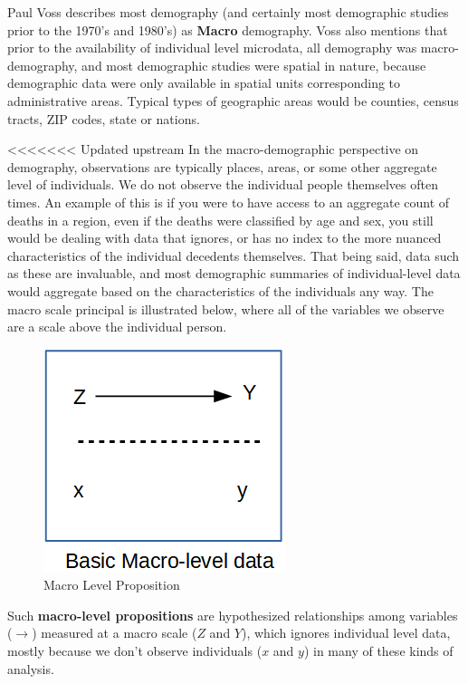 \documentclass[
]{article}
\begin{document}
Paul Voss \citeyearpar{voss_demography_2007} describes most demography (and certainly most demographic studies prior to the 1970's and 1980's) as \textbf{Macro} demography. Voss also mentions that prior to the availability of individual level microdata, all demography was macro-demography, and most demographic studies were spatial in nature, because demographic data were only available in spatial units corresponding to administrative areas. Typical types of geographic areas would be counties, census tracts, ZIP codes, state or nations.

\textless\textless\textless\textless\textless\textless\textless{} Updated upstream In the macro-demographic perspective on demography, observations are typically places, areas, or some other aggregate level of individuals. We do not observe the individual people themselves often times. An example of this is if you were to have access to an aggregate count of deaths in a region, even if the deaths were classified by age and sex, you still would be dealing with data that ignores, or has no index to the more nuanced characteristics of the individual decedents themselves. That being said, data such as these are invaluable, and most demographic summaries of individual-level data would aggregate based on the characteristics of the individuals any way. The macro scale principal is illustrated below, where all of the variables we observe are a scale above the individual person.

\begin{figure}
\centering
\includegraphics{images/macro2.png}
\caption{Macro Level Proposition}
\end{figure}

Such \textbf{macro-level propositions} are hypothesized relationships among variables (\(\rightarrow\)) measured at a macro scale (\(Z\) and \(Y\)), which ignores individual level data, mostly because we don't observe individuals (\(x\) and \(y\)) in many of these kinds of analysis.
\end{document}
